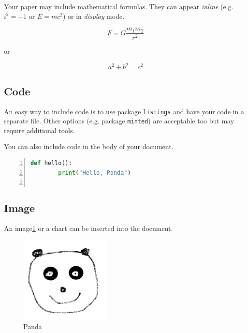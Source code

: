 \documentclass[11pt]{sigplanconf}
\begin{document}
Your paper may include mathematical formulas. They can appear \textit{inline} (e.g. \begin{math}i^2=-1\end{math} or $E=mc^2$) or in \textit{display} mode.

\begin{equation}
    F = G \frac{m_1 m_2}{r^2}
\end{equation}

or

$$a^2 + b^2 = c^2$$

\subsection{Code}

An easy way to include code is to use package \texttt{listings} and have your code in a separate file. Other options (e.g. package \texttt{minted}) are acceptable too but may require additional tools.



You can also include code in the body of your document.

\begin{lstlisting}[language=Python, numbers=left, numberstyle=\tiny]
    def hello():
        print("Hello, Panda")
    
\end{lstlisting}

\subsection{Image}

An image\ref{fig:panda1} or a chart can be inserted into the document.

\begin{figure}[!htbp]
    \includegraphics[width=0.4\textwidth]{panda.png}
    \caption{Panda}
    \label{fig:panda1}

\end{figure}
\end{document}
